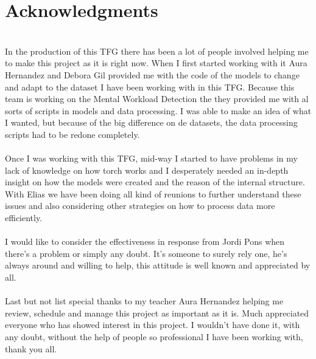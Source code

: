 \section{Acknowledgments}
\leavevmode\\
In the production of this TFG there has been a lot of people involved helping me to make this project as it is right now. When I first started working with it Aura Hernandez and Debora Gil provided me with the code of the models to change and adapt to the dataset I have been working with in this TFG. Because this team is working on the Mental Workload Detection the they provided me with al sorts of scripts in models and data processing. I was able to make an idea of what I wanted, but because of the big difference on de datasets, the data processing scripts had to be redone completely.
\\\\
Once I was working with this TFG, mid-way I started to have problems in my lack of knowledge on how torch works and I desperately needed an in-depth insight on how the models were created and the reason of the internal structure. With Elias we have been doing all kind of reunions to further understand these issues and also considering other strategies on how to process data more efficiently.
\\\\
I would like to consider the effectiveness in response from Jordi Pons when there’s a problem or simply any doubt. It’s someone to surely rely one, he’s always around and willing to help, this attitude is well known and appreciated by all.
\\\\
Last but not list special thanks to my teacher Aura Hernandez helping me review, schedule and manage this project as important as it is. Much appreciated everyone who has showed interest in this project. I wouldn’t have done it, with any doubt, without the help of people so professional I have been working with, thank you all.
\\